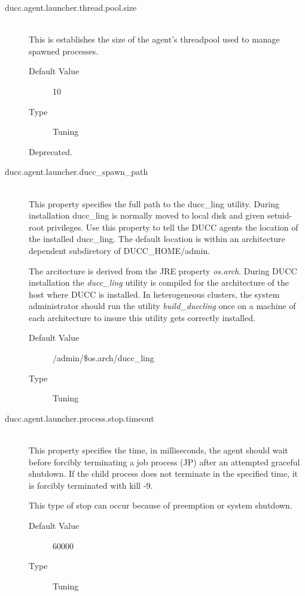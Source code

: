 \begin{description}
        \item[ducc.agent.launcher.thread.pool.size] \hfill \\
          This is establishes the size of the agent's threadpool used to manage spawned processes. 
          \begin{description}
            \item[Default Value] 10 
            \item[Type] Tuning 
          \end{description}
          Deprecated.
                    
        \item[ducc.agent.launcher.ducc\_spawn\_path] \hfill \\
          This property specifies the full path to the ducc\_ling utility. During installation ducc\_ling 
          is normally moved to local disk and given setuid-root privileges. Use this property to tell 
          the DUCC agents the location of the installed ducc\_ling.  The default location is within
          an architecture dependent subdiretory of DUCC\_HOME/admin.  

          The arcitecture is derived from
          the JRE property {\em os.arch}.  During DUCC installation the {\em ducc\_ling} utility is
          compiled for the architecture of the host where DUCC is installed.  In heterogeneous
          clusters, the system administrator should run the utility {\em build\_duccling} once on
          a machine of each architecture to insure this utility gets correctly installed.
          \begin{description}
            \item[Default Value] \ducchome/admin/\${os.arch}/ducc\_ling 
            \item[Type] Tuning             
          \end{description}
          
        \item[ducc.agent.launcher.process.stop.timeout] \hfill \\
          This property specifies the time, in milliseconds, the agent should wait before forcibly 
          terminating a job process (JP) after an attempted graceful shutdown. If the child process 
          does not terminate in the specified time, it is forcibly terminated with kill -9. 

          This type of stop can occur because of preemption or system shutdown. 
          \begin{description}
            \item[Default Value] 60000 
            \item[Type] Tuning 
          \end{description}
          

\end{description}
